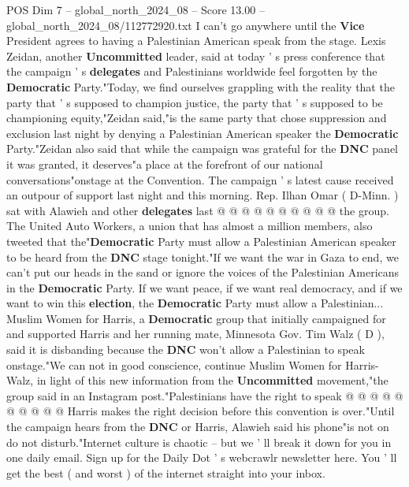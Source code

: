 \begin{textsample}{POS Dim 7 – global\_north\_2024\_08 – Score 13.00 – global\_north\_2024\_08/112772920.txt}
I can't go anywhere until the \textbf{Vice} President agrees to having a Palestinian American speak from the stage.
Lexis Zeidan, another \textbf{Uncommitted} leader, said at today ' s press conference that the campaign ' s \textbf{delegates} and Palestinians worldwide feel forgotten by the \textbf{Democratic} Party."Today, we find ourselves grappling with the reality that the party that ' s supposed to champion justice, the party that ' s supposed to be championing equity,"Zeidan said,"is the same party that chose suppression and exclusion last night by denying a Palestinian American speaker the \textbf{Democratic} Party."Zeidan also said that while the campaign was grateful for the \textbf{DNC} panel it was granted, it deserves"a place at the forefront of our national conversations"onstage at the Convention.
The campaign ' s latest cause received an outpour of support last night and this morning.
Rep.
Ilhan Omar ( D-Minn. ) sat with Alawieh and other \textbf{delegates} last @ @ @ @ @ @ @ @ @ @ the group.
The United Auto Workers, a union that has almost a million members, also tweeted that the"\textbf{Democratic} Party must allow a Palestinian American speaker to be heard from the \textbf{DNC} stage tonight."If we want the war in Gaza to end, we can't put our heads in the sand or ignore the voices of the Palestinian Americans in the \textbf{Democratic} Party.
If we want peace, if we want real democracy, and if we want to win this \textbf{election}, the \textbf{Democratic} Party must allow a Palestinian...
Muslim Women for Harris, a \textbf{Democratic} group that initially campaigned for and supported Harris and her running mate, Minnesota Gov.
Tim Walz ( D ), said it is disbanding because the \textbf{DNC} won't allow a Palestinian to speak onstage."We can not in good conscience, continue Muslim Women for Harris-Walz, in light of this new information from the \textbf{Uncommitted} movement,"the group said in an Instagram post."Palestinians have the right to speak @ @ @ @ @ @ @ @ @ @ Harris makes the right decision before this convention is over."Until the campaign hears from the \textbf{DNC} or Harris, Alawieh said his phone"is not on do not disturb."Internet culture is chaotic -- but we ' ll break it down for you in one daily email.
Sign up for the Daily Dot ' s webcrawlr newsletter here.
You ' ll get the best ( and worst ) of the internet straight into your inbox.

\end{textsample}
